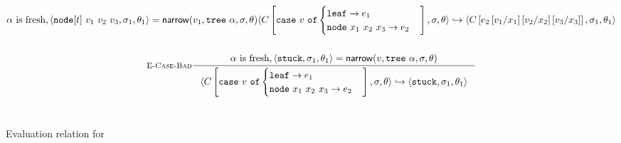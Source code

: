 \begin{figure*}
\begin{gather*}
  {\thole \mbox{ is fresh}, \triple{\vnode{t}{v_1}{v_2}{v_3}}{\vsu_1}{\tsu_1} = \force{v_1}{\ttree{\thole}}{\vsu}{\tsu}
  }
  {\step{\inctx{\ecase{v}{e_1}{x_1}{x_2}{x_3}{e_2}}}{\vsu}{\tsu}
        {\inctx{e_2\sub{x_1}{v_1}\sub{x_2}{v_2}\sub{x_3}{v_3}}}{\vsu_1}{\tsu_1}}
\\ \\
\inference[\recasebad]
  {\thole \mbox{ is fresh}, \triple{\stuck}{\vsu_1}{\tsu_1} = \force{v}{\ttree{\thole}}{\vsu}{\tsu}
  }
  {\step{\inctx{\ecase{v}{e_1}{x_1}{x_2}{x_3}{e_2}}}{\vsu}{\tsu}
        {\stuck}{\vsu_1}{\tsu_1}}
\end{gather*}
\\ %
\caption{Evaluation relation for \lang}
\label{fig:operational}
\end{figure*}
